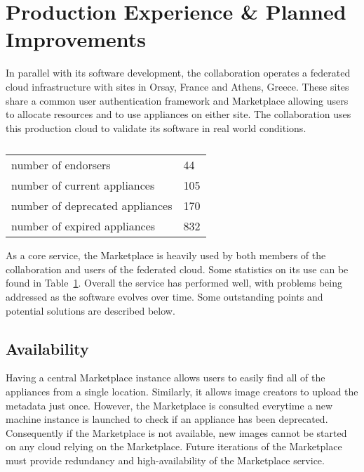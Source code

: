 \section{Production Experience \& Planned Improvements}
\label{sec:production}

In parallel with its software development, the collaboration operates
a federated cloud infrastructure with sites in Orsay, France and
Athens, Greece\@.  These sites share a common user authentication
framework and Marketplace allowing users to allocate resources and to
use appliances on either site.  The collaboration uses this production
cloud to validate its software in real world conditions.

\begin{table}
\caption{}
\label{tab:statistics}
\begin{center}
\begin{tabular}{ll}
\hline
number of endorsers & 44 \\
number of current appliances & 105 \\
number of deprecated appliances & 170 \\
number of expired appliances & 832 \\
\hline
\end{tabular}
\end{center}
\end{table}

As a core service, the Marketplace is heavily used by both members of
the collaboration and users of the federated cloud.  Some statistics
on its use can be found in Table~\ref{tab:statistics}.  Overall the
service has performed well, with problems being addressed as the
software evolves over time.  Some outstanding points and potential
solutions are described below.

\subsection{Availability}

Having a central Marketplace instance allows users to easily find all
of the appliances from a single location.  Similarly, it allows image
creators to upload the metadata just once.  However, the Marketplace
is consulted everytime a new machine instance is launched to check if
an appliance has been deprecated.  Consequently if the Marketplace is
not available, new images cannot be started on any cloud relying on
the Marketplace\@.  Future iterations of the Marketplace must provide
redundancy and high-availability of the Marketplace service. 

